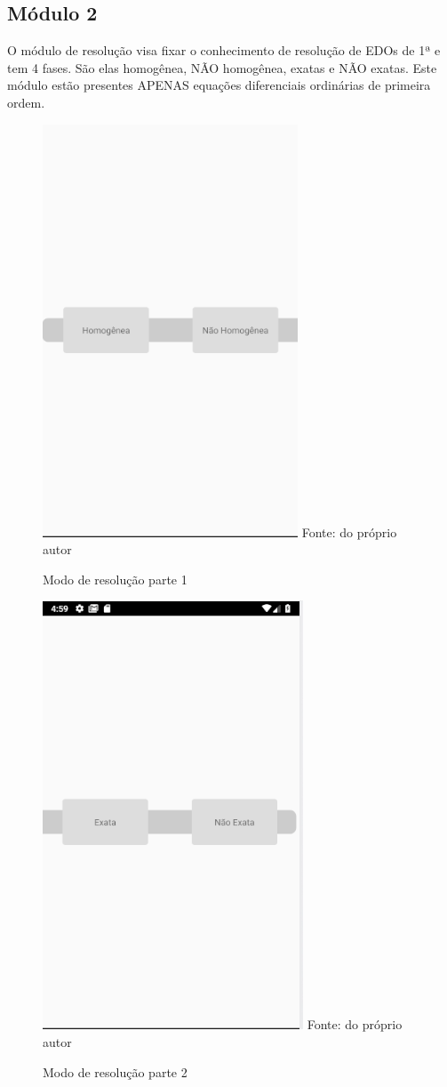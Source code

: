\subsection[Módulo 2]{Módulo 2}

O módulo de resolução visa fixar o conhecimento de resolução de EDOs de 1ª e tem 4 fases. São elas homogênea, NÃO homogênea, exatas e NÃO exatas. Este módulo estão presentes APENAS equações diferenciais ordinárias de primeira ordem. 

\begin{figure}[H]
\centering
\caption{Modo de resolução parte 1}
\includegraphics[scale=0.72]{figuras/modo_resolucao_1.png}
\small{Fonte: do próprio autor}
\end{figure}

\begin{figure}[H]
\centering
\caption{Modo de resolução parte 2}
\includegraphics[scale=0.72]{figuras/modo_resolucao_2.png}
\small{Fonte: do próprio autor}
\end{figure}



